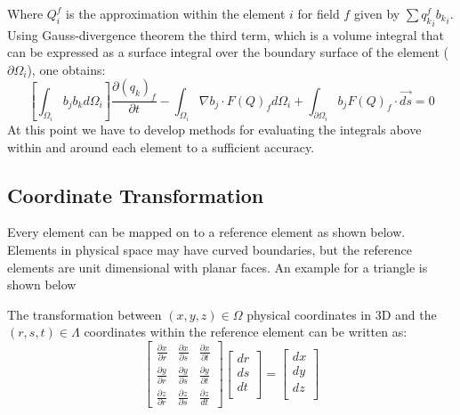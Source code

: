 \documentclass[11pt]{article}
\begin{document}
Where $Q_i^f$ is the approximation within the element $i$ for field $f$ given by $\sum {q^f_k}_i {b_k}_i$. Using
Gauss-divergence theorem the third term, which is a volume integral that can be expressed as a surface integral
over the boundary surface of the element ($\partial \Omega_i$), one obtains:
\begin{equation}
  \left[\int_{\Omega_i} {b_j} {b_k} d\Omega_i\right]\frac{\partial {(q_k)_f}}{\partial t} - \int_{\Omega_i} \nabla b_j
\cdot F(Q)_f d \Omega_i + \int_{\partial\Omega_i} b_j F(Q)_f \cdot \vec{ds}  = 0
\label{eq8}
\end{equation}
At this point we have to develop methods for evaluating the integrals above within and
around each element to a sufficient accuracy. 

\subsection{Coordinate Transformation}
Every element can be mapped on to a reference element as shown below. Elements in physical
space may have curved boundaries, but the reference elements are unit dimensional with
planar faces. An example for a triangle is shown below  \newline
{}
\newline
The transformation between $(x,y,z)\in \Omega$ physical coordinates in 3D and the
$(r,s,t)\in \Lambda$ coordinates within the reference element can be written as:
\begin{equation}
\begin{bmatrix}
  \frac{\partial x}{\partial r} & \frac{\partial x}{\partial s} & \frac{\partial x}{\partial t}\\
  \frac{\partial y}{\partial r} & \frac{\partial y}{\partial s} & \frac{\partial y}{\partial t}\\
  \frac{\partial z}{\partial r} & \frac{\partial z}{\partial s} & \frac{\partial z}{dt}
\end{bmatrix}
\begin{bmatrix}
  dr\\
  ds\\
  dt\\
\end{bmatrix}
=
\begin{bmatrix}
  dx \\
  dy \\
  dz \\
\end{bmatrix}
\end{equation}
\end{document}
